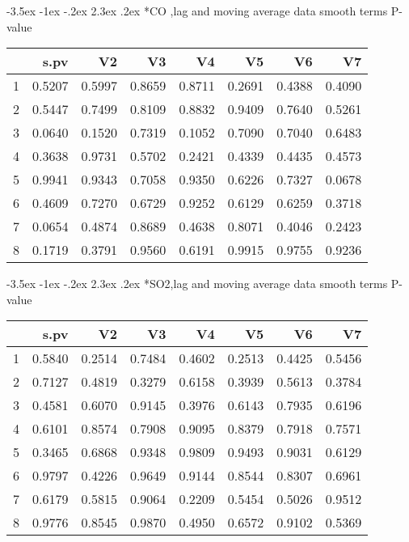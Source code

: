 \documentclass[a4paper, 12pt]{article}
\makeatletter
\def\Large{\fontsize{16}{24}\selectfont}
\renewcommand\section{\@startsection {section}{1}{\z@}%
                                   {-3.5ex \@plus -1ex \@minus -.2ex}%
                                   {2.3ex \@plus.2ex}%
                                   {\centering\normalfont\Large\bfseries}}
\makeatother
\begin{document}
\section*{CO ,lag and moving average data}
smooth terms P-value
\begin{table}[ht]
\centering
\begin{tabular}{rrrrrrrr}
  \hline
 & s.pv & V2 & V3 & V4 & V5 & V6 & V7 \\
  \hline
1 & 0.5207 & 0.5997 & 0.8659 & 0.8711 & 0.2691 & 0.4388 & 0.4090 \\
  2 & 0.5447 & 0.7499 & 0.8109 & 0.8832 & 0.9409 & 0.7640 & 0.5261 \\
  3 & 0.0640 & 0.1520 & 0.7319 & 0.1052 & 0.7090 & 0.7040 & 0.6483 \\
  4 & 0.3638 & 0.9731 & 0.5702 & 0.2421 & 0.4339 & 0.4435 & 0.4573 \\
  5 & 0.9941 & 0.9343 & 0.7058 & 0.9350 & 0.6226 & 0.7327 & 0.0678 \\
  6 & 0.4609 & 0.7270 & 0.6729 & 0.9252 & 0.6129 & 0.6259 & 0.3718 \\
  7 & 0.0654 & 0.4874 & 0.8689 & 0.4638 & 0.8071 & 0.4046 & 0.2423 \\
  8 & 0.1719 & 0.3791 & 0.9560 & 0.6191 & 0.9915 & 0.9755 & 0.9236 \\
   \hline
\end{tabular}
\end{table}
\clearpage
\section*{SO2,lag and moving average data}
smooth terms P-value
\begin{table}[ht]
\centering
\begin{tabular}{rrrrrrrr}
  \hline
 & s.pv & V2 & V3 & V4 & V5 & V6 & V7 \\
  \hline
1 & 0.5840 & 0.2514 & 0.7484 & 0.4602 & 0.2513 & 0.4425 & 0.5456 \\
  2 & 0.7127 & 0.4819 & 0.3279 & 0.6158 & 0.3939 & 0.5613 & 0.3784 \\
  3 & 0.4581 & 0.6070 & 0.9145 & 0.3976 & 0.6143 & 0.7935 & 0.6196 \\
  4 & 0.6101 & 0.8574 & 0.7908 & 0.9095 & 0.8379 & 0.7918 & 0.7571 \\
  5 & 0.3465 & 0.6868 & 0.9348 & 0.9809 & 0.9493 & 0.9031 & 0.6129 \\
  6 & 0.9797 & 0.4226 & 0.9649 & 0.9144 & 0.8544 & 0.8307 & 0.6961 \\
  7 & 0.6179 & 0.5815 & 0.9064 & 0.2209 & 0.5454 & 0.5026 & 0.9512 \\
  8 & 0.9776 & 0.8545 & 0.9870 & 0.4950 & 0.6572 & 0.9102 & 0.5369 \\
   \hline
\end{tabular}
\end{table}
\clearpage
\end{document}
